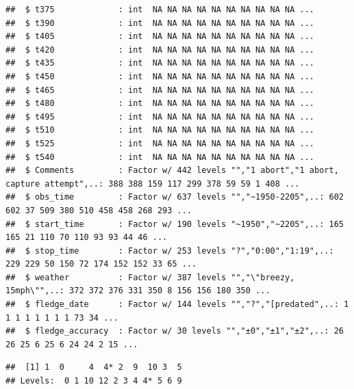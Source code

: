 \documentclass[]{article}
\newenvironment{Shaded}{\begin{snugshade}}{\end{snugshade}}
\newcommand{\CommentTok}[1]{\textcolor[rgb]{0.56,0.35,0.01}{\textit{#1}}}
\newcommand{\KeywordTok}[1]{\textcolor[rgb]{0.13,0.29,0.53}{\textbf{#1}}}
\newcommand{\NormalTok}[1]{#1}
\newcommand{\OperatorTok}[1]{\textcolor[rgb]{0.81,0.36,0.00}{\textbf{#1}}}
\begin{document}
\begin{verbatim}
##  $ t375             : int  NA NA NA NA NA NA NA NA NA NA ...
##  $ t390             : int  NA NA NA NA NA NA NA NA NA NA ...
##  $ t405             : int  NA NA NA NA NA NA NA NA NA NA ...
##  $ t420             : int  NA NA NA NA NA NA NA NA NA NA ...
##  $ t435             : int  NA NA NA NA NA NA NA NA NA NA ...
##  $ t450             : int  NA NA NA NA NA NA NA NA NA NA ...
##  $ t465             : int  NA NA NA NA NA NA NA NA NA NA ...
##  $ t480             : int  NA NA NA NA NA NA NA NA NA NA ...
##  $ t495             : int  NA NA NA NA NA NA NA NA NA NA ...
##  $ t510             : int  NA NA NA NA NA NA NA NA NA NA ...
##  $ t525             : int  NA NA NA NA NA NA NA NA NA NA ...
##  $ t540             : int  NA NA NA NA NA NA NA NA NA NA ...
##  $ Comments         : Factor w/ 442 levels "","1 abort","1 abort, capture attempt",..: 388 388 159 117 299 378 59 59 1 408 ...
##  $ obs_time         : Factor w/ 637 levels "","~1950-2205",..: 602 602 37 509 380 510 458 458 268 293 ...
##  $ start_time       : Factor w/ 190 levels "~1950","~2205",..: 165 165 21 110 70 110 93 93 44 46 ...
##  $ stop_time        : Factor w/ 253 levels "?","0:00","1:19",..: 229 229 50 150 72 174 152 152 33 65 ...
##  $ weather          : Factor w/ 387 levels "","\"breezy, 15mph\"",..: 372 372 376 331 350 8 156 156 180 350 ...
##  $ fledge_date      : Factor w/ 144 levels "","?","[predated",..: 1 1 1 1 1 1 1 1 73 34 ...
##  $ fledge_accuracy  : Factor w/ 30 levels "","±0","±1","±2",..: 26 26 25 6 25 6 24 24 2 15 ...
\end{verbatim}

\begin{Shaded}
\end{Shaded}

\begin{verbatim}
##  [1] 1  0     4  4* 2  9  10 3  5 
## Levels:  0 1 10 12 2 3 4 4* 5 6 9
\end{verbatim}

\begin{Shaded}
\end{Shaded}
\end{document}
